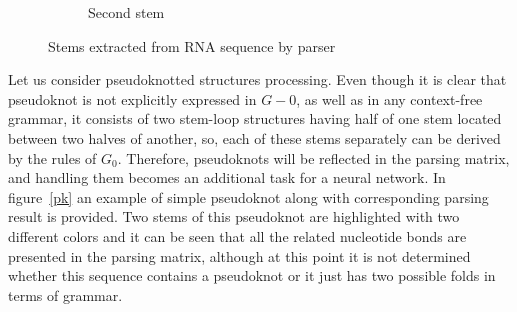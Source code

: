 \begin{figure}[h]
{{\begin{subfigure}{.4\textwidth}
    \caption{Second stem}
    \label{stem2}
    \end{subfigure}%
  }\cr
}
\caption{Stems extracted from RNA sequence by parser}
\label{pars_res}
\end{figure}

Let us consider pseudoknotted structures processing. Even though it is clear that pseudoknot is not explicitly expressed in $G-0$, as well as in any context-free grammar, it consists of two stem-loop structures having half of one stem located between two halves of another, so, each of these stems separately can be derived by the rules of $G_0$. Therefore, pseudoknots will be reflected in the parsing matrix, and handling them becomes an additional task for a neural network. In figure~\ref{pk} an example of simple pseudoknot along with corresponding parsing result is provided. Two stems of this pseudoknot are highlighted with two different colors and it can be seen that all the related nucleotide bonds are presented in the parsing matrix, although at this point it is not determined whether this sequence contains a pseudoknot or it just has two possible folds in terms of grammar.

